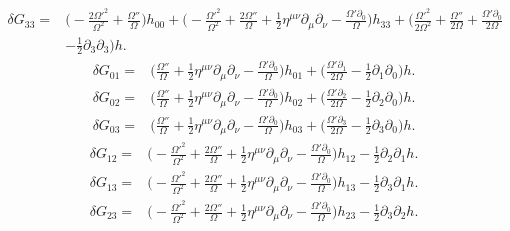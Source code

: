 \documentclass[10pt,letterpaper]{article}
\begin{document}
\begin{align}
\delta G_{33}={}&\bigg(- \frac{2 \Omega '^2}{\Omega^2}
 + \frac{\Omega ''}{\Omega}\bigg) h_{00}
 + \bigg(- \frac{\Omega '^2}{\Omega^2}
 + \frac{2 \Omega ''}{\Omega}
 + \tfrac{1}{2} \eta^{\mu \nu} \partial_{\mu} \partial_{\nu}
 -  \frac{\Omega ' \partial_{0}}{\Omega}\bigg) h_{33}
 + \bigg(\frac{\Omega '^2}{2 \Omega^2}
 + \frac{\Omega ''}{2 \Omega}
 + \frac{\Omega ' \partial_{0}}{2 \Omega}\nonumber\\
& -  \tfrac{1}{2} \partial_{3} \partial_{3}\bigg) h.
\end{align}
\begin{align}
\delta G_{01}={}&\bigg(\frac{\Omega ''}{\Omega}
 + \tfrac{1}{2} \eta^{\mu \nu} \partial_{\mu} \partial_{\nu}
 -  \frac{\Omega ' \partial_{0}}{\Omega}\bigg) h_{01}
 + \bigg(\frac{\Omega ' \partial_{1}}{2 \Omega}
 -  \tfrac{1}{2} \partial_{1} \partial_{0}\bigg) h.
\end{align}
\begin{align}
\delta G_{02}={}&\bigg(\frac{\Omega ''}{\Omega}
 + \tfrac{1}{2} \eta^{\mu \nu} \partial_{\mu} \partial_{\nu}
 -  \frac{\Omega ' \partial_{0}}{\Omega}\bigg) h_{02}
 + \bigg(\frac{\Omega ' \partial_{2}}{2 \Omega}
 -  \tfrac{1}{2} \partial_{2} \partial_{0}\bigg) h.
\end{align}
\begin{align}
\delta G_{03}={}&\bigg(\frac{\Omega ''}{\Omega}
 + \tfrac{1}{2} \eta^{\mu \nu} \partial_{\mu} \partial_{\nu}
 -  \frac{\Omega ' \partial_{0}}{\Omega}\bigg) h_{03}
 + \bigg(\frac{\Omega ' \partial_{3}}{2 \Omega}
 -  \tfrac{1}{2} \partial_{3} \partial_{0}\bigg) h.
\end{align}
\begin{align}
\delta G_{12}={}&\bigg(- \frac{\Omega '^2}{\Omega^2}
 + \frac{2 \Omega ''}{\Omega}
 + \tfrac{1}{2} \eta^{\mu \nu} \partial_{\mu} \partial_{\nu}
 -  \frac{\Omega ' \partial_{0}}{\Omega}\bigg) h_{12}
 -  \tfrac{1}{2} \partial_{2} \partial_{1} h.
\end{align}
\begin{align}
\delta G_{13}={}&\bigg(- \frac{\Omega '^2}{\Omega^2}
 + \frac{2 \Omega ''}{\Omega}
 + \tfrac{1}{2} \eta^{\mu \nu} \partial_{\mu} \partial_{\nu}
 -  \frac{\Omega ' \partial_{0}}{\Omega}\bigg) h_{13}
 -  \tfrac{1}{2} \partial_{3} \partial_{1} h.
\end{align}
\begin{align}
\delta G_{23}={}&\bigg(- \frac{\Omega '^2}{\Omega^2}
 + \frac{2 \Omega ''}{\Omega}
 + \tfrac{1}{2} \eta^{\mu \nu} \partial_{\mu} \partial_{\nu}
 -  \frac{\Omega ' \partial_{0}}{\Omega}\bigg) h_{23}
 -  \tfrac{1}{2} \partial_{3} \partial_{2} h.
\end{align}
\end{document}
